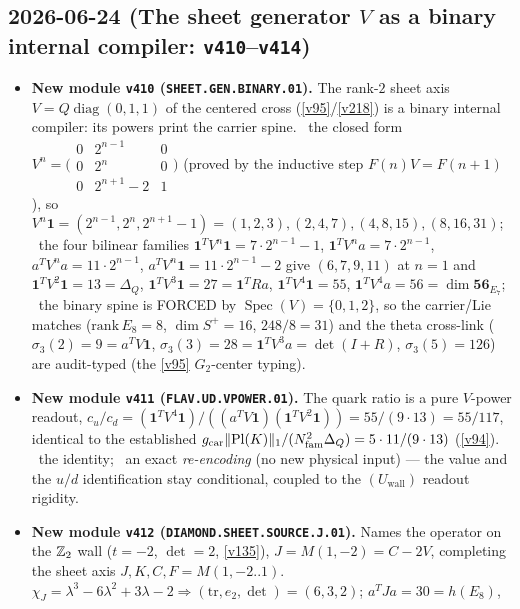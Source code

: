 \subsection*{2026-06-24 (The sheet generator $V$ as a binary internal compiler: \texttt{v410}--\texttt{v414})}
\begin{itemize}
\item \textbf{New module \texttt{v410} (\texttt{SHEET.GEN.BINARY.01}).} The rank-$2$ sheet axis
$V=Q\operatorname{diag}(0,1,1)$ of the centered cross (\vref{v95}/\vref{v218}) is a binary internal compiler:
its powers print the carrier spine. \mE\ the closed form $V^n=\big(\begin{smallmatrix}0&2^{n-1}&0\\0&2^n&0\\0&2^{n+1}-2&1\end{smallmatrix}\big)$
(proved by the inductive step $F(n)V{=}F(n{+}1)$), so $V^n\mathbf 1=(2^{n-1},2^n,2^{n+1}-1)=(1,2,3),(2,4,7),(4,8,15),(8,16,31)$;
\mE\ the four bilinear families $\mathbf 1^TV^n\mathbf 1=7\cdot2^{n-1}{-}1$, $\mathbf 1^TV^na=7\cdot2^{n-1}$,
$a^TV^na=11\cdot2^{n-1}$, $a^TV^n\mathbf 1=11\cdot2^{n-1}{-}2$ give $(6,7,9,11)$ at $n{=}1$ and
$\mathbf 1^TV^2\mathbf 1{=}13{=}\Delta_Q$, $\mathbf 1^TV^3\mathbf 1{=}27{=}\mathbf 1^TRa$,
$\mathbf 1^TV^4\mathbf 1{=}55$, $\mathbf 1^TV^4a{=}56{=}\dim\mathbf{56}_{E_7}$; \mC\ the binary spine is FORCED by
$\operatorname{Spec}(V){=}\{0,1,2\}$, so the carrier/Lie matches ($\mathrm{rank}\,E_8{=}8$, $\dim S^+{=}16$,
$248/8{=}31$) and the theta cross-link ($\sigma_3(2){=}9{=}a^TV\mathbf 1$, $\sigma_3(3){=}28{=}\mathbf 1^TV^3a{=}\det(I{+}R)$,
$\sigma_3(5){=}126$) are audit-typed (the \vref{v95} $G_2$-center typing).
\item \textbf{New module \texttt{v411} (\texttt{FLAV.UD.VPOWER.01}).} The quark ratio is a pure $V$-power readout,
$c_u/c_d=(\mathbf 1^TV^4\mathbf 1)/((a^TV\mathbf 1)(\mathbf 1^TV^2\mathbf 1))=55/(9\cdot13)=55/117$, identical to the
established $g_{\mathrm{car}}\|\mathrm{Pl}(K)\|_1/(N_{\mathrm{fam}}^2\Delta_Q)=5\cdot11/(9\cdot13)$ (\vref{v94}). \mE\ the identity; \mC\ an
exact \emph{re-encoding} (no new physical input) --- the value and the $u/d$ identification stay conditional, coupled
to the $(U_{\mathrm{wall}})$ readout rigidity.
\item \textbf{New module \texttt{v412} (\texttt{DIAMOND.SHEET.SOURCE.J.01}).} Names the operator on the $\mathbb{Z}_2$ wall
($t{=}{-}2$, $\det{=}2$, \vref{v135}), $J{=}M(1,{-}2){=}C{-}2V$, completing the sheet axis $J,K,C,F{=}M(1,{-}2..1)$.
\mE\ $\chi_J=\lambda^3-6\lambda^2+3\lambda-2\Rightarrow(\mathrm{tr},e_2,\det){=}(6,3,2)$; $a^TJa{=}30{=}h(E_8)$,

\end{itemize}
